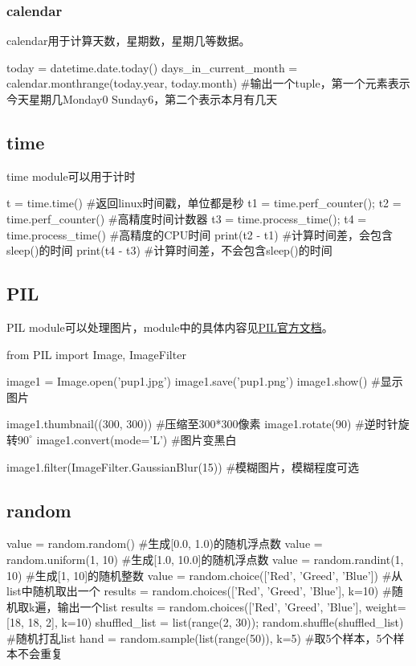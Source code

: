     \subsubsection{calendar}
      calendar用于计算天数，星期数，星期几等数据。
      \begin{codeblock}[language=python, caption={calendar module}]
        today = datetime.date.today()
        days_in_current_month = calendar.monthrange(today.year, today.month)
        #输出一个tuple，第一个元素表示今天星期几Monday0 Sunday6，第二个表示本月有几天
      \end{codeblock}

  \subsection{time}
    time module可以用于计时
    \begin{codeblock}[language=python, caption={time module}]
      t = time.time() #返回linux时间戳，单位都是秒
      t1 = time.perf_counter(); t2 = time.perf_counter() #高精度时间计数器
      t3 = time.process_time(); t4 = time.process_time() #高精度的CPU时间
      print(t2 - t1) #计算时间差，会包含sleep()的时间
      print(t4 - t3) #计算时间差，不会包含sleep()的时间
    \end{codeblock}

  \subsection{PIL}
    PIL module可以处理图片，module中的具体内容见\href{https://pillow-cn.readthedocs.io/zh-cn/latest/}{\underline{PIL官方文档}}。
    \begin{codeblock}[language=python, caption={PIL}]
      from PIL import Image, ImageFilter

      image1 = Image.open('pup1.jpg')
      image1.save('pup1.png')
      image1.show() #显示图片

      image1.thumbnail((300, 300)) #压缩至300*300像素
      image1.rotate(90) #逆时针旋转$90^{\circ}$
      image1.convert(mode='L') #图片变黑白

      image1.filter(ImageFilter.GaussianBlur(15)) #模糊图片，模糊程度可选
    \end{codeblock}

  \subsection{random}
    \begin{codeblock}[language=python, caption={random module}]
      value = random.random() #生成[0.0, 1.0)的随机浮点数
      value = random.uniform(1, 10) #生成[1.0, 10.0]的随机浮点数
      value = random.randint(1, 10) #生成[1, 10]的随机整数
      value = random.choice(['Red', 'Greed', 'Blue']) #从list中随机取出一个
      results = random.choices(['Red', 'Greed', 'Blue'], k=10) #随机取k遍，输出一个list
      results = random.choices(['Red', 'Greed', 'Blue'], weight=[18, 18, 2], k=10) 
      shuffled_list = list(range(2, 30)); random.shuffle(shuffled_list) #随机打乱list
      hand = random.sample(list(range(50)), k=5) #取5个样本，5个样本不会重复
    \end{codeblock}

